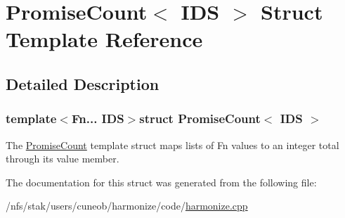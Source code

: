 \hypertarget{structPromiseCount}{\section{Promise\-Count$<$ I\-D\-S $>$ Struct Template Reference}
\label{structPromiseCount}
}


\subsection{Detailed Description}
\subsubsection*{template$<$Fn... I\-D\-S$>$struct Promise\-Count$<$ I\-D\-S $>$}

The {\ttfamily \hyperlink{structPromiseCount}{Promise\-Count}} template struct maps lists of {\ttfamily Fn} values to an integer total through its {\ttfamily value} member. 

The documentation for this struct was generated from the following file\-:\begin{DoxyCompactItemize}
\item 
/nfs/stak/users/cuneob/harmonize/code/\hyperlink{harmonize_8cpp}{harmonize.\-cpp}\end{DoxyCompactItemize}
